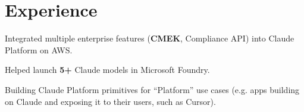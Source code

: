 \documentclass[letterpaper]{deedy-resume} %
\begin{document}
\hfill
%
%
\begin{minipage}[t]{0.63\textwidth} %


\section{Experience}


\vspace{\topsep} %
\begin{tightitemize}
\item Integrated multiple enterprise features (\textbf{CMEK}, Compliance API) into Claude Platform on AWS.
\item Helped launch \textbf{5+} Claude models in Microsoft Foundry.
\item Building Claude Platform primitives for ``Platform'' use cases (e.g. apps building on Claude and exposing it to their users, such as Cursor).
\end{tightitemize}
\sectionspace %
\vspace{-0.3em}


\end{minipage}
\end{document}
